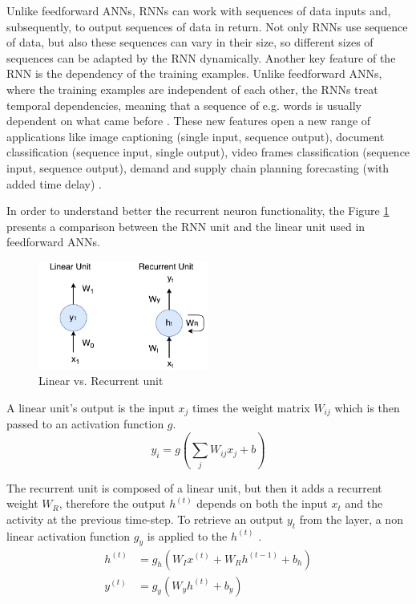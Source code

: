 Unlike feedforward ANNs, RNNs can work with sequences of data inputs and, subsequently, to output sequences of data in return. Not only RNNs use sequence of data, but also these sequences can vary in their size, so different sizes of sequences can be adapted by the RNN dynamically. Another key feature of the RNN is the dependency of the training examples. Unlike feedforward ANNs, where the training examples are independent of each other, the RNNs treat temporal dependencies, meaning that a sequence of e.g. words is usually dependent on what came before \cite{NeonRNN}. These new features open a new range of applications like image captioning (single input, sequence output), document classification (sequence input, single output), video frames classification (sequence input, sequence output), demand and supply chain planning forecasting (with added time delay) \cite{RNNvideo}.

In order to understand better the recurrent neuron functionality, the Figure \ref{Units} presents a comparison between the RNN unit and the linear unit used in feedforward ANNs.
\begin{figure}[H]
	\centering
	\includegraphics[width=0.5\textwidth]{Figures/RecurrentUnit}
	\caption{Linear vs. Recurrent unit}
	\label{Units}
\end{figure}
A linear unit's output is the input $x_{j}$ times the weight matrix $W_{ij}$ which is then passed to an activation function $g$.
\begin{equation}\label{linearOutput}
y_{i}=g(\sum_{j}W_{ij}x_{j}+b)
\end{equation}

The recurrent unit is composed of a linear unit, but then it adds a recurrent weight $W_{R}$, therefore the output  $h^{(t)}$ depends on both the input $x_{t}$ and the activity at the previous time-step. To retrieve an output $y_{t}$ from the layer, a non linear activation function $g_{y}$ is applied to the $h^{(t)}$ \cite{NeonRNN}.
\begin{equation}\label{recurrentOutput}
\begin{aligned}
h^{(t)}&=g_{h}(W_{I}x^{(t)}+W_{R}h^{(t-1)}+b_{h})\\
y^{(t)}&=g_{y}(W_{y}h^{(t)}+b_{y})
\end{aligned}
\end{equation}

